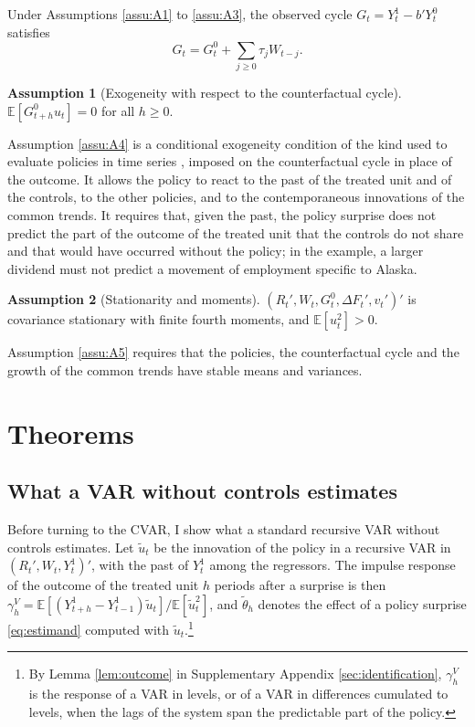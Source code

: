 \documentclass[12pt,a4paper]{article}
\theoremstyle{definition}
\newtheorem{assumption}{Assumption}
\theoremstyle{definition}\newtheorem{example}{Example}
\theoremstyle{definition}\newtheorem{definition}{Definition}
\newcommand{\E}{\mathbb{E}}
\begin{document}
Under Assumptions \ref{assu:A1} to \ref{assu:A3}, the observed cycle $G_t=Y^1_t-b'Y^0_t$ satisfies
\begin{equation}
G_t=G^0_t+\sum_{j\geq0}\tau_jW_{t-j}.
\label{eq:cycle}
\end{equation}

\begin{assumption}[Exogeneity with respect to the counterfactual cycle\label{assu:A4}]
$\E[G^0_{t+h}u_t]=0$ for all $h\geq0$.
\end{assumption}

Assumption \ref{assu:A4} is a conditional exogeneity condition of the kind used to evaluate policies in time series \citep{AngristJordaKuersteiner2018}, imposed on the counterfactual cycle in place of the outcome. It allows the policy to react to the past of the treated unit and of the controls, to the other policies, and to the contemporaneous innovations of the common trends. It requires that, given the past, the policy surprise does not predict the part of the outcome of the treated unit that the controls do not share and that would have occurred without the policy; in the example, a larger dividend must not predict a movement of employment specific to Alaska.

\begin{assumption}[Stationarity and moments\label{assu:A5}]
$(R_t',W_t,G^0_t,\Delta F_t',v_t')'$ is covariance stationary with finite fourth moments, and $\E[u_t^2]>0$.
\end{assumption}

Assumption \ref{assu:A5} requires that the policies, the counterfactual cycle and the growth of the common trends have stable means and variances.

\section{Theorems\label{sec:theorems}}

\subsection{What a VAR without controls estimates\label{sec:var}}

Before turning to the CVAR, I show what a standard recursive VAR without controls estimates. Let $\tilde u_t$ be the innovation of the policy in a recursive VAR in $(R_t',W_t,Y^1_t)'$, with the past of $Y^1_t$ among the regressors. The impulse response of the outcome of the treated unit $h$ periods after a surprise is then $\gamma^{V}_h=\E[(Y^1_{t+h}-Y^1_{t-1})\tilde u_t]/\E[\tilde u_t^2]$, and $\tilde\theta_h$ denotes the effect of a policy surprise \eqref{eq:estimand} computed with $\tilde u_t$.\footnote{By Lemma \ref{lem:outcome} in Supplementary Appendix \ref{sec:identification}, $\gamma^V_h$ is the response of a VAR in levels, or of a VAR in differences cumulated to levels, when the lags of the system span the predictable part of the policy.}
\end{document}
